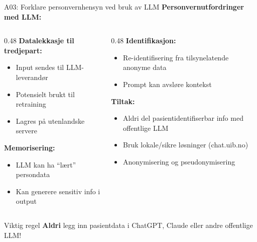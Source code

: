 \documentclass[aspectratio=169, 10pt]{beamer}
\begin{document}
\begin{frame}{A03: Forklare personvernhensyn ved bruk av LLM}
    \textbf{Personvernutfordringer med LLM:}
    
    \vspace{0.3cm}
    \begin{columns}[T]
        \begin{column}{0.48\textwidth}
            \textbf{Datalekkasje til tredjepart:}
            \begin{itemize}
                \item Input sendes til LLM-leverandør
                \item Potensielt brukt til retraining
                \item Lagres på utenlandske servere
            \end{itemize}
            
            \vspace{0.3cm}
            \textbf{Memorisering:}
            \begin{itemize}
                \item LLM kan ha ``lært'' persondata
                \item Kan generere sensitiv info i output
            \end{itemize}
        \end{column}
        \begin{column}{0.48\textwidth}
            \textbf{Identifikasjon:}
            \begin{itemize}
                \item Re-identifisering fra tilsynelatende anonyme data
                \item Prompt kan avsløre kontekst
            \end{itemize}
            
            \vspace{0.3cm}
            \textbf{Tiltak:}
            \begin{itemize}
                \item Aldri del pasientidentifiserbar info med offentlige LLM
                \item Bruk lokale/sikre løsninger (chat.uib.no)
                \item Anonymisering og pseudonymisering
            \end{itemize}
        \end{column}
    \end{columns}
    
    \vspace{0.3cm}
    \begin{alertblock}{Viktig regel}
        \textbf{Aldri} legg inn pasientdata i ChatGPT, Claude eller andre offentlige LLM!
    \end{alertblock}
\end{frame}
\end{document}
